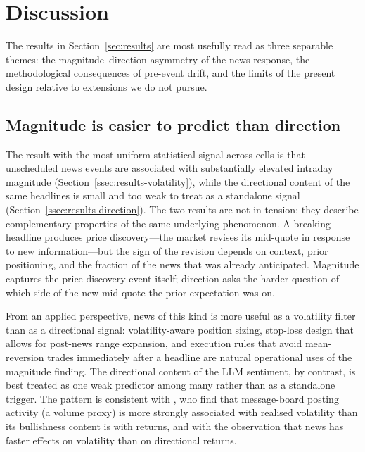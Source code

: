 \section{Discussion}
\label{sec:discussion}

The results in Section~\ref{sec:results} are most usefully read as
three separable themes: the magnitude--direction asymmetry of the
news response, the methodological consequences of pre-event drift,
and the limits of the present design relative to extensions we do
not pursue.

\subsection{Magnitude is easier to predict than direction}

The result with the most uniform statistical signal across cells is
that unscheduled news events are associated with substantially
elevated intraday magnitude (Section~\ref{ssec:results-volatility}),
while the directional content of the same headlines is small and
too weak to treat as a standalone signal
(Section~\ref{ssec:results-direction}). The two results are not in
tension: they describe complementary properties of the same
underlying phenomenon. A breaking headline produces price
discovery---the market revises its mid-quote in response to new
information---but the sign of the revision depends on context, prior
positioning, and the fraction of the news that was already
anticipated. Magnitude captures the price-discovery event itself;
direction asks the harder question of which side of the new
mid-quote the prior expectation was on.

From an applied perspective, news of this kind is more useful as a
volatility filter than as a directional signal: volatility-aware
position sizing, stop-loss design that allows for post-news range
expansion, and execution rules that avoid mean-reversion trades
immediately after a headline are natural operational uses of the
magnitude finding. The directional content of the LLM sentiment, by
contrast, is best treated as one weak predictor among many rather
than as a standalone trigger. The pattern is consistent with
\citet{antweiler2004talk}, who find that message-board posting
activity (a volume proxy) is more strongly associated with realised
volatility than its bullishness content is with returns, and with
the \citet{heston2017news} observation that news has faster effects
on volatility than on directional returns.

